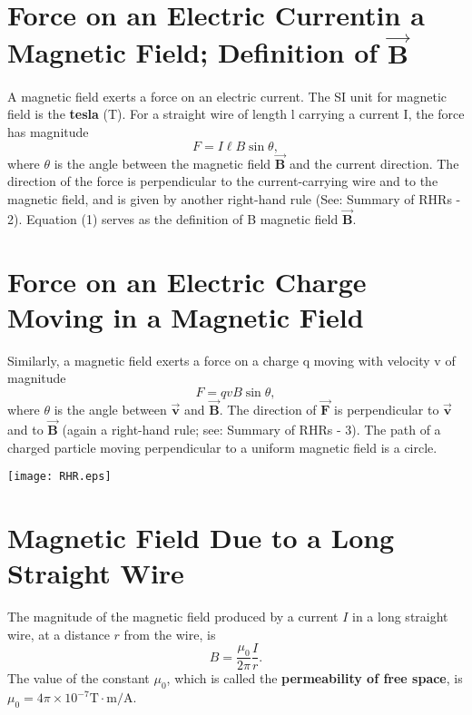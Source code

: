 \documentclass{elegantpaper}
\begin{document}
\begin{multicols}{3}
\section{Force on an Electric Currentin a Magnetic Field; Definition of $\vec { \mathbf { B } }$}
A magnetic field exerts a force on an electric current. The SI unit for magnetic field is the \textbf{tesla} (T). For a straight wire of length l carrying a current I, the force has magnitude
\begin{equation}
  F = I \ell B \sin \theta,
\end{equation}
where $\theta$ is the angle between the magnetic field $\vec { \mathbf { B } }$ and the current direction. The direction of the force is perpendicular to the current-carrying wire and to the magnetic field, and is given by another right-hand rule (See: Summary of RHRs - 2). Equation (1) serves as the definition of B
magnetic field $\vec { \mathbf { B } }$.
\section{Force on an Electric Charge Moving in a Magnetic Field}
Similarly, a magnetic field exerts a force on a charge q moving with velocity v of magnitude
\begin{equation}
F = q v B \sin \theta,
\end{equation}
where $\theta$ is the angle between $\vec { \mathbf { v } }$ and $\vec { \mathbf { B } }$. The direction of $\vec { \mathbf { F } }$ is perpendicular to $\vec { \mathbf { v } }$ and to $\vec { \mathbf { B } }$  (again a right-hand rule; see: Summary of RHRs - 3). The path of a charged particle moving perpendicular to a uniform magnetic field is a circle.

\begin{minipage}{\linewidth}
  \vspace{0.5cm}
  \setlength{\abovecaptionskip}{0.2cm}
  \setlength{\belowcaptionskip}{0.3cm}
  \centering
  \texttt{[image: RHR.eps]}
  \label{fig:20-8}
\end{minipage}

\section{Magnetic Field Due to a Long Straight Wire}
The magnitude of the magnetic field produced by a current $I$ in a long straight wire, at a distance $r$ from the wire, is
\begin{equation}
B = \frac { \mu _ { 0 } } { 2 \pi } \frac { I } { r }.
\end{equation}
The value of the constant $\mu _ { 0 }$, which is called the \textbf{permeability of free space}, is $\mu _ { 0 } = 4 \pi \times 10 ^ { - 7 } \mathrm { T } \cdot \mathrm { m } / \mathrm { A }$.

\end{multicols}
\end{document}
